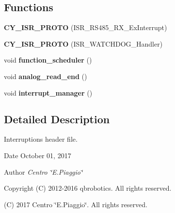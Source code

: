 \subsection*{Functions}
\begin{DoxyCompactItemize}
\item 
\mbox{\label{interruptions_8h_a7e24af8c83537b0441877bf0f00dd30a}} 
{\bfseries C\+Y\+\_\+\+I\+S\+R\+\_\+\+P\+R\+O\+TO} (I\+S\+R\+\_\+\+R\+S485\+\_\+\+R\+X\+\_\+\+Ex\+Interrupt)
\item 
\mbox{\label{interruptions_8h_a212cae8995d67d612c236fb54a4d29dc}} 
{\bfseries C\+Y\+\_\+\+I\+S\+R\+\_\+\+P\+R\+O\+TO} (I\+S\+R\+\_\+\+W\+A\+T\+C\+H\+D\+O\+G\+\_\+\+Handler)
\item 
\mbox{\label{interruptions_8h_a0fe51278c957933282ca63f3ac9beeaf}} 
void {\bfseries function\+\_\+scheduler} ()
\item 
\mbox{\label{interruptions_8h_a00a8d34962a63161405e5d7785b9625e}} 
void {\bfseries analog\+\_\+read\+\_\+end} ()
\item 
\mbox{\label{interruptions_8h_a9790811526002d99b25a814afd02cbae}} 
void {\bfseries interrupt\+\_\+manager} ()
\end{DoxyCompactItemize}


\subsection{Detailed Description}
Interruptions header file. 

\begin{DoxyDate}{Date}
October 01, 2017 
\end{DoxyDate}
\begin{DoxyAuthor}{Author}
{\itshape Centro \char`\"{}\+E.\+Piaggio\char`\"{}} 
\end{DoxyAuthor}
\begin{DoxyCopyright}{Copyright}
(C) 2012-\/2016 qbrobotics. All rights reserved. 

(C) 2017 Centro \char`\"{}\+E.\+Piaggio\char`\"{}. All rights reserved. 
\end{DoxyCopyright}
